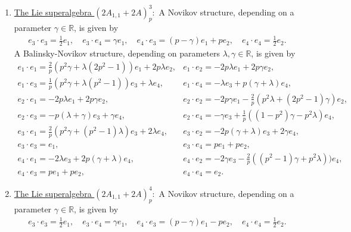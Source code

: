 \documentclass[12pt]{amsart}
\begin{document}
\begin{enumerate}
\[\begin{array}{llll}
e_2\cdot e_4= (\gamma - \lambda)  e_3+\lambda e_4, \\[2mm]  e_3\cdot e_1= 2 \gamma e_3,& 
e_3 \cdot e_2=2 \gamma e_3, & e_3 \cdot e_3=e_1, & 
e_3 \cdot e_4=e_1, \\[2mm]
e_4\cdot e_1=2 \gamma e_3, & e_4\cdot e_2=-2(\lambda- \gamma) e_3+ 2 \lambda e_4,& e_4\cdot e_3=e_1, & e_4 \cdot e_4=e_2.
 \end{array}
 \]
   \item \underline{The Lie superalgebra $(2A_{1,1}+2A)^3_p:$} A Novikov structure, depending on a parameter $\gamma \in \mathbb R$, is given by
    \[
\begin{array}{l}
e_3\cdot e_3= \frac{1}{2}e_1 , \quad e_3\cdot e_4= \gamma e_1, \quad e_4\cdot e_3= (p- \gamma) e_1 + p e_2,  \quad e_4\cdot e_4= \frac{1}{2} e_2.
\end{array}
\]
A Balinsky-Novikov structure, depending on parameters $\lambda, \gamma \in \mathbb R$, is given by
 \[
 \begin{array}{lll}
e_1 \cdot e_1= \frac{2}{p} (p^2 \gamma + \lambda(2 p^2-1)) e_1 + 2p \lambda e_2, & e_1\cdot e_2= -2 p\lambda e_1+2 p \gamma e_2, \\[2mm] 
e_1\cdot e_3= \frac{1}{p}(p^2\gamma +\lambda(p^2-1)) e_3+ \lambda e_4, &  
e_1\cdot e_4=-\lambda e_3+p( \gamma+\lambda)e_4,\\[2mm] 
e_2\cdot e_1= -2p \lambda e_1+2p \gamma e_2,& 
e_2\cdot e_2=-2 p \gamma e_1- \frac{2}{p}(p^2 \lambda+(2p^2-1)\gamma) e_2, 
\\[2mm] 
e_2\cdot e_3=  -p( \lambda +\gamma)  e_3 + \gamma e_4, & 
e_2\cdot e_4= -\gamma  e_3 + \frac{1}{p}((1-p^2)\gamma-p^2\lambda) e_4, \\[2mm]  e_3\cdot e_1= \frac{2}{p}(p^2\gamma +(p^2-1)\lambda) e_3 +2 \lambda e_4, & 
e_3 \cdot e_2=-2p ( \gamma + \lambda) e_3 + 2 \gamma e_4, \\[2mm] e_3 \cdot e_3=e_1, &
e_3 \cdot e_4=p e_1+p e_2, \\[2mm]
e_4\cdot e_1=-2 \lambda e_3+ 2p(\gamma + \lambda)e_4, & 
e_4\cdot e_2=-2 \gamma e_3  - \frac{2}{p}((p^2-1)\gamma+p^2\lambda)) e_4, \\[2mm] e_4\cdot e_3=p e_1 + p e_2, & e_4 \cdot e_4=e_2.
 \end{array}
 \]
   \item \underline{The Lie superalgebra $(2A_{1,1}+2A)^4_p:$} A Novikov structure, depending on a parameter $\gamma \in \mathbb R$, is given by
    \[
\begin{array}{l}
e_3\cdot e_3= \frac{1}{2}e_1 , \quad e_3\cdot e_4= \gamma e_1, \quad e_4\cdot e_3=(p-\gamma) e_1-pe_2, \quad e_4\cdot e_4= \frac{1}{2} e_2.

\end{array}\]
\end{enumerate}
\end{document}
